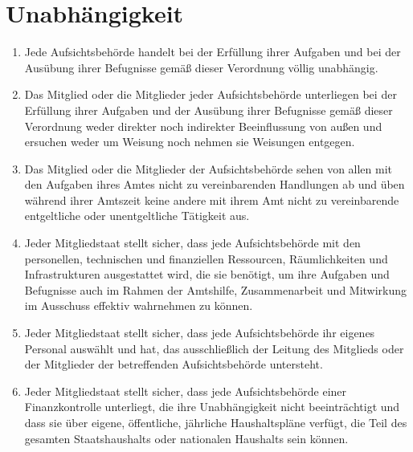 \chapter{Unabhängigkeit}
\label{ch:52}


\begin{enumerate}

  \item Jede Aufsichtsbehörde handelt bei der Erfüllung ihrer Aufgaben und bei der Ausübung ihrer Befugnisse gemäß
   dieser Verordnung völlig unabhängig.
  \label{itm:52-1}

  \item Das Mitglied oder die Mitglieder jeder Aufsichtsbehörde unterliegen bei der Erfüllung ihrer Aufgaben und der
   Ausübung ihrer Befugnisse gemäß dieser Verordnung weder direkter noch indirekter Beeinflussung von außen und
   ersuchen weder um Weisung noch nehmen sie Weisungen entgegen.
  \label{itm:52-2}

  \item Das Mitglied oder die Mitglieder der Aufsichtsbehörde sehen von allen mit den Aufgaben ihres Amtes nicht zu
   vereinbarenden Handlungen ab und üben während ihrer Amtszeit keine andere mit ihrem Amt nicht zu vereinbarende
   entgeltliche oder unentgeltliche Tätigkeit aus.
  \label{itm:52-3}

  \item Jeder Mitgliedstaat stellt sicher, dass jede Aufsichtsbehörde mit den personellen, technischen und finanziellen
   Ressourcen, Räumlichkeiten und Infrastrukturen ausgestattet wird, die sie benötigt, um ihre Aufgaben und Befugnisse
   auch im Rahmen der Amtshilfe, Zusammenarbeit und Mitwirkung im Ausschuss effektiv wahrnehmen zu können.
  \label{itm:52-4}

  \item Jeder Mitgliedstaat stellt sicher, dass jede Aufsichtsbehörde ihr eigenes Personal auswählt und hat, das
   ausschließlich der Leitung des Mitglieds oder der Mitglieder der betreffenden Aufsichtsbehörde untersteht.
  \label{itm:52-5}

  \item Jeder Mitgliedstaat stellt sicher, dass jede Aufsichtsbehörde einer Finanzkontrolle unterliegt, die ihre
   Unabhängigkeit nicht beeinträchtigt und dass sie über eigene, öffentliche, jährliche Haushaltspläne verfügt, die
   Teil des gesamten Staatshaushalts oder nationalen Haushalts sein können.
  \label{itm:52-6}

\end{enumerate}


